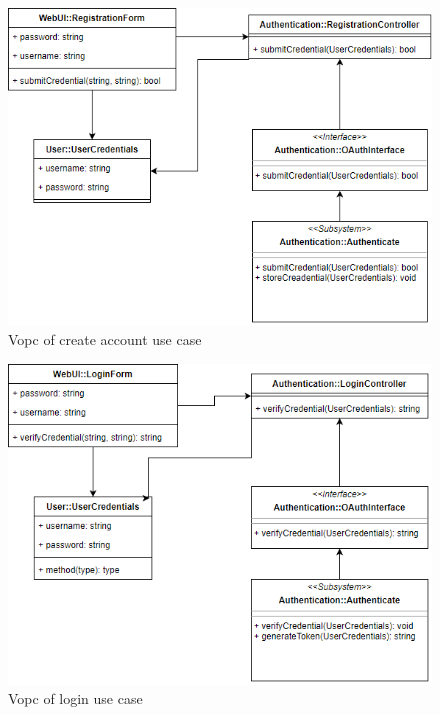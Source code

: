 \documentclass[a4paper]{article}
\begin{document}
    \begin{figure}[H]
        \centering
        \includegraphics[width=1.0\textwidth]{vopc_register.png}
        \caption{Vopc of create account use case}
        \label{fig:fig22}
    \end{figure}

    \begin{figure}[H]
        \centering
        \includegraphics[width=1.0\textwidth]{vopc_login.png}
        \caption{Vopc of login use case}
        \label{fig:fig23}
    \end{figure}
\end{document}
